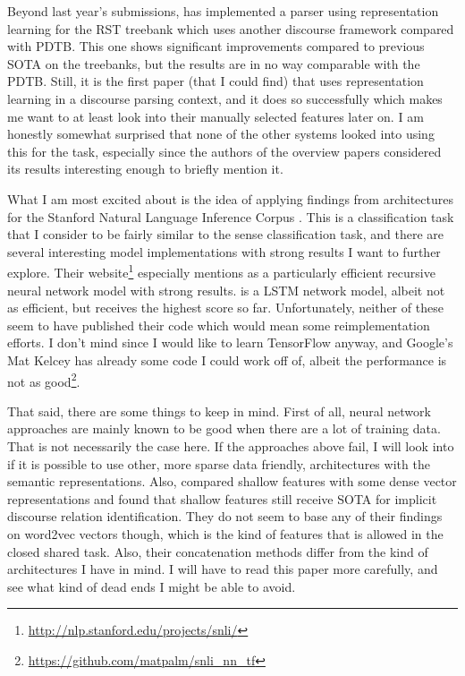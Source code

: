 Beyond last year's submissions, \cite{ji_representation_2014} has implemented a parser using representation learning for the RST treebank which uses another discourse framework compared with PDTB. This one shows significant improvements compared to previous SOTA on the treebanks, but the results are in no way comparable with the PDTB. Still, it is the first paper (that I could find) that uses representation learning in a discourse parsing context, and it does so successfully which makes me want to at least look into their manually selected features later on. I am honestly somewhat surprised that none of the other systems looked into using this for the task, especially since the authors of the overview papers considered its results interesting enough to briefly mention it.

What I am most excited about is the idea of applying findings from architectures for the Stanford Natural Language Inference Corpus \citep{bowman_large_2015}. This is a classification task that I consider to be fairly similar to the sense classification task, and there are several interesting model implementations with strong results I want to further explore. Their website\footnote{\url{http://nlp.stanford.edu/projects/snli/}} especially mentions \cite{mou_recognizing_2015} as a particularly efficient recursive neural network model with strong results. \cite{cheng_long_2016} is a LSTM network model, albeit not as efficient, but receives the highest score so far. Unfortunately, neither of these seem to have published their code which would mean some reimplementation efforts. I don't mind since I would like to learn TensorFlow anyway, and Google's Mat Kelcey has already some code I could work off of, albeit the performance is not as good\footnote{\url{https://github.com/matpalm/snli_nn_tf}}.

That said, there are some things to keep in mind. First of all, neural network approaches are mainly known to be good when there are a lot of training data. That is not necessarily the case here. If the approaches above fail, I will look into if it is possible to use other, more sparse data friendly, architectures with the semantic representations. Also, \cite{braud_comparing_2015} compared shallow features with some dense vector representations and found that shallow features still receive SOTA for implicit discourse relation identification. They do not seem to base any of their findings on word2vec vectors though, which is the kind of features that is allowed in the closed shared task. Also, their concatenation methods differ from the kind of architectures I have in mind. I will have to read this paper more carefully, and see what kind of dead ends I might be able to avoid.

